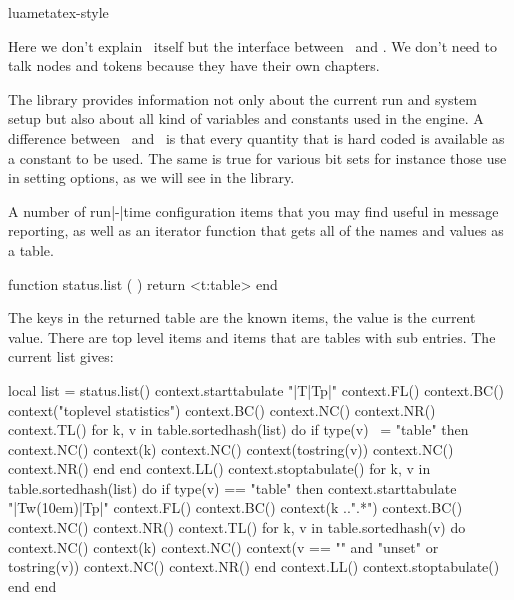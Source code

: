 
\environment luametatex-style

\startdocument[title=\TEX,xtitle=\TEX]

\startsection[title={Introduction}]

Here we don't explain \TEX\ itself but the interface between \TEX\ and \LUA. We
don't need to talk nodes and tokens because they have their own chapters.

\stopsection

\startsection[title={Status information}]

The  library provides information not only about the current run
and system setup but also about all kind of variables and constants used in the
engine. A difference between \LUATEX\ and \LUAMETATEX\ is that every quantity
that is hard coded is available as a constant to be used. The same is true for
various bit sets for instance those use in setting options, as we will see in the
 library.

A number of run|-|time configuration items that you may find useful
in message reporting, as well as an iterator function that gets all of the names
and values as a table.

\starttyping[option=LUA]
function status.list ( )
    return <t:table>
end
\stoptyping

The keys in the returned table are the known items, the value is the current
value. There are top level items and items that are tables with sub entries. The
current list gives:

\startluacode
    local list = status.list()
    context.starttabulate { "|T|Tp|" }
        context.FL()
        context.BC() context("toplevel statistics")
        context.BC()
        context.NC() context.NR()
        context.TL()
        for k, v in table.sortedhash(list) do
            if type(v) ~= "table" then
                context.NC() context(k)
                context.NC() context(tostring(v))
                context.NC() context.NR()
            end
        end
        context.LL()
    context.stoptabulate()
    for k, v in table.sortedhash(list) do
        if type(v) == "table" then
            context.starttabulate { "|Tw(10em)|Tp|" }
                context.FL()
                context.BC() context(k ..".*")
                context.BC()
                context.NC() context.NR()
                context.TL()
                for k, v in table.sortedhash(v) do
                    context.NC() context(k)
                    context.NC() context(v == "" and "unset" or tostring(v))
                    context.NC() context.NR()
                end
                context.LL()
            context.stoptabulate()
        end
    end
\stopluacode

